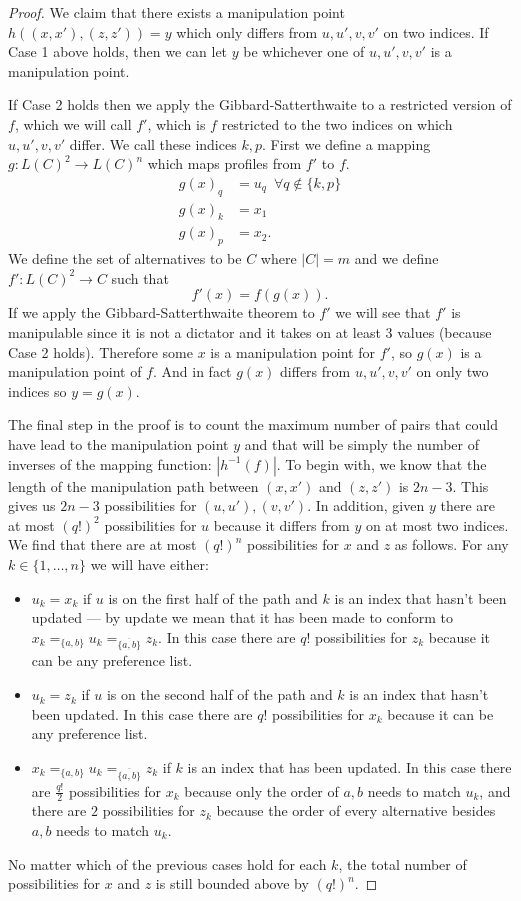 \begin{proof}
		We claim that there exists a manipulation point $h((x, x'), (z, z')) = y$ which only differs from $u, u', v, v'$ on two indices. If Case 1 above holds, then we can let $y$ be whichever one of $u, u', v, v'$ is a manipulation point.

		If Case 2 holds then we apply the Gibbard-Satterthwaite to a restricted version of $f$, which we will call $f'$, which is $f$ restricted to the two indices on which $u, u', v, v'$ differ. We call these indices $k, p$. First we define a mapping $g : L(C)^2 \rightarrow L(C)^n$ which maps profiles from $f'$ to $f$.
		\begin{align*}
			g(x)_q &= u_q \,\,\, \forall q \notin \{k, p\} \\
			g(x)_k &= x_1 \\
			g(x)_p &= x_2.
		\end{align*}
		We define the set of alternatives to be $C$ where $|C| = m$ and we define $f' : L(C)^2 \rightarrow C$ such that
		\[
			f'(x) = f(g(x)).
		\]
		If we apply the Gibbard-Satterthwaite theorem \cite{gibbard1973manipulation, satterthwaite1975strategy} to $f'$ we will see that $f'$ is manipulable since it is not a dictator and it takes on at least 3 values (because Case 2 holds). Therefore some $x$ is a manipulation point for $f'$, so $g(x)$ is a manipulation point of $f$. And in fact $g(x)$ differs from $u, u', v, v'$ on only two indices so $y = g(x)$.

		The final step in the proof is to count the maximum number of pairs that could have lead to the manipulation point $y$ and that will be simply the number of inverses of the mapping function: $|h^{-1}(f)|$. To begin with, we know that the length of the manipulation path between $(x, x')$ and $(z, z')$ is $2n - 3$. This gives us $2n - 3$ possibilities for $(u, u'), (v, v')$. In addition, given $y$ there are at most $(q!)^2$ possibilities for $u$ because it differs from $y$ on at most two indices. We find that there are at most $(q!)^n$ possibilities for $x$ and $z$ as follows. For any $k \in \{1, \ldots, n\}$ we will have either:
		\begin{itemize}
			\item $u_k = x_k$ if $u$ is on the first half of the path and $k$ is an index that hasn't been updated --- by update we mean that it has been made to conform to $x_k =_{\{a,b\}} u_k =_{\overline{\{a,b\}}} z_k$. In this case there are $q!$ possibilities for $z_k$ because it can be any preference list.
			\item $u_k = z_k$ if $u$ is on the second half of the path and $k$ is an index that hasn't been updated. In this case there are $q!$ possibilities for $x_k$ because it can be any preference list.
			\item $x_k =_{\{a,b\}} u_k =_{\overline{\{a,b\}}} z_k$ if $k$ is an index that has been updated. In this case there are $\frac{q!}{2}$ possibilities for $x_k$ because only the order of $a, b$ needs to match $u_k$, and there are $2$ possibilities for $z_k$ because the order of every alternative besides $a, b$ needs to match $u_k$.
		\end{itemize}
		No matter which of the previous cases hold for each $k$, the total number of possibilities for $x$ and $z$ is still bounded above by $(q!)^n$.


\end{proof}
